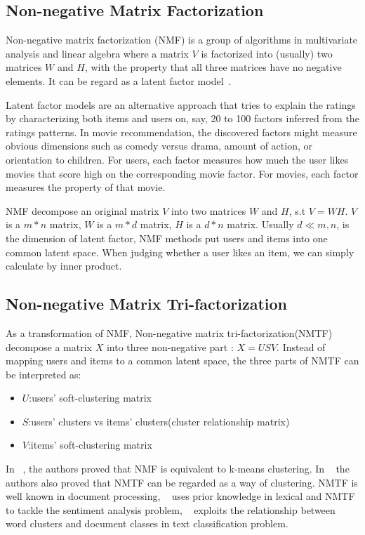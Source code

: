 \hspace{0.05in}
\subsection{Non-negative Matrix Factorization}
Non-negative matrix factorization (NMF) is a group of algorithms in multivariate analysis and linear algebra where a matrix $V$ is factorized into (usually) two matrices $W$ and $H$, with the property that all three matrices have no negative elements. It can be regard as a latent factor model~\cite{/computer/yehuda09matrix}.

Latent factor models are an alternative approach that tries to explain the ratings by characterizing both items and users on, say, 20 to 100 factors inferred from the ratings patterns. In movie recommendation, the discovered factors might measure obvious dimensions such as comedy versus
drama, amount of action, or orientation to children. For users, each factor measures how much the user likes movies that score high on the corresponding movie factor. For movies, each factor measures the property of that movie.

NMF decompose an original matrix $V$ into two matrices $W$ and $H$, s.t $V = WH$. $V$ is a $m*n$ matrix, $W$ is a $m*d$ matrix, $H$ is a $d*n$ matrix. Usually $d \ll m,n$, is the dimension of latent factor, NMF methods put users and items into one common latent space. When judging whether a user likes an item, we can simply calculate by inner product.

\hspace{0.05in}
\subsection{Non-negative Matrix Tri-factorization}
As a transformation of NMF, Non-negative matrix tri-factorization(NMTF) decompose a matrix $X$ into three non-negative part : $X = USV$. Instead of mapping users and items to a common latent space, the three parts of NMTF can be interpreted as:
\begin{itemize}
\item $U$:users' soft-clustering matrix
\item $S$:users' clusters vs items' clusters(cluster relationship matrix)
\item $V$:items' soft-clustering matrix
\end{itemize}

In ~\cite{Ding05onthe}, the authors proved that NMF is equivalent to k-means clustering. In ~\cite{Ding06orthogonalnonnegative} the authors also proved that NMTF can be regarded as a way of clustering. NMTF is well known in document processing, ~\cite{Li:2009:NMT:1687878.1687914} uses prior knowledge in lexical and NMTF to tackle the sentiment analysis problem, ~\cite{Zhuang:2011:EAW:1952191.1952195} exploits the relationship between word clusters and document classes in text classification problem.

